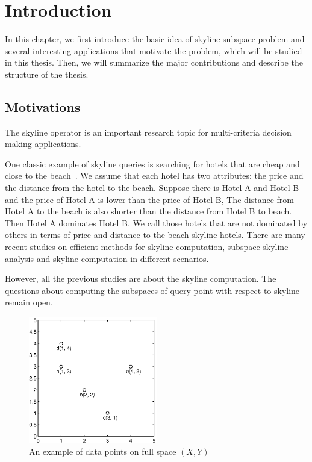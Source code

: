 
%
%

\chapter{Introduction}

In this chapter, we first introduce the basic idea of skyline subspace problem and several interesting applications that motivate the problem, which will be studied in this thesis. Then, we will summarize the major contributions and describe the structure of the thesis.

\section{Motivations}
The skyline operator is an important research topic for multi-criteria decision making applications.

One classic example of skyline queries is searching for hotels that are cheap and close to the beach~\cite{borzsony2001skyline}. We assume that each hotel has two attributes: the price and the distance from the hotel to the beach.
Suppose there is Hotel A and Hotel B and the price of Hotel A is lower than the price of Hotel B, The distance from Hotel A to the beach is also shorter than the distance from Hotel B to beach.
Then Hotel A dominates Hotel B.
We call those hotels that are not dominated by others in terms of price and distance to the beach skyline hotels. 
There are many recent studies on efficient methods for skyline computation, subspace skyline analysis and skyline computation in different scenarios.

However, all the previous studies are about the skyline computation. The questions about computing the subspaces of query point with respect to skyline remain open.

\begin{figure}[H]
\centering
\includegraphics[width=0.5\textwidth]{figs/intro_xy.eps}
\caption{An example of data points on full space $(X, Y)$}
\label{fig:intro_xy}
\end{figure}

